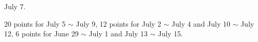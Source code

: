 July 7.

20 points for July 5 $\sim$ July 9, 12 points for July 2 $\sim$ July 4 and
July 10 $\sim$ July 12, 6 points for June 29 $\sim$ July 1 and July 13
$\sim$ July 15.
